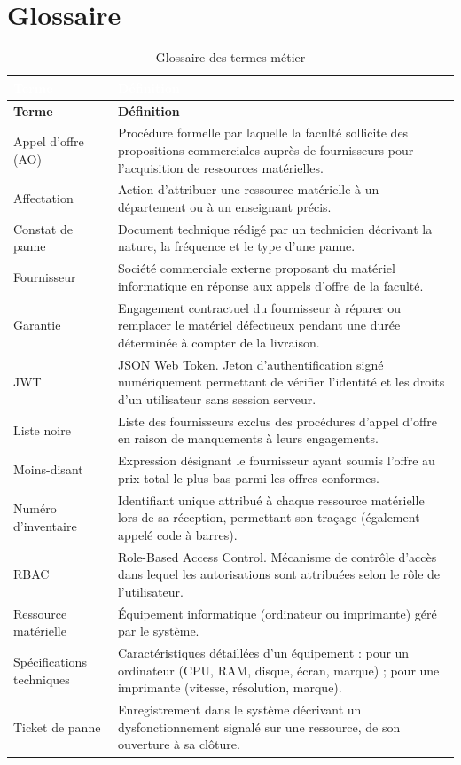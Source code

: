 \documentclass[12pt,a4paper]{report}
\begin{document}
\chapter{Glossaire}

\begin{longtable}{|L{3.5cm}|L{10cm}|}
\caption{Glossaire des termes métier} \\
\hline
{}\textcolor{white}{\textbf{Terme}} & \textcolor{white}{\textbf{Définition}} \\
\hline
\endfirsthead
\hline
\textbf{Terme} & \textbf{Définition} \\
\hline
\endhead
Appel d'offre (AO) & Procédure formelle par laquelle la faculté sollicite des propositions commerciales auprès de fournisseurs pour l'acquisition de ressources matérielles. \\
\hline
Affectation & Action d'attribuer une ressource matérielle à un département ou à un enseignant précis. \\
\hline
Constat de panne & Document technique rédigé par un technicien décrivant la nature, la fréquence et le type d'une panne. \\
\hline
Fournisseur & Société commerciale externe proposant du matériel informatique en réponse aux appels d'offre de la faculté. \\
\hline
Garantie & Engagement contractuel du fournisseur à réparer ou remplacer le matériel défectueux pendant une durée déterminée à compter de la livraison. \\
\hline
JWT & JSON Web Token. Jeton d'authentification signé numériquement permettant de vérifier l'identité et les droits d'un utilisateur sans session serveur. \\
\hline
Liste noire & Liste des fournisseurs exclus des procédures d'appel d'offre en raison de manquements à leurs engagements. \\
\hline
Moins-disant & Expression désignant le fournisseur ayant soumis l'offre au prix total le plus bas parmi les offres conformes. \\
\hline
Numéro d'inventaire & Identifiant unique attribué à chaque ressource matérielle lors de sa réception, permettant son traçage (également appelé code à barres). \\
\hline
RBAC & Role-Based Access Control. Mécanisme de contrôle d'accès dans lequel les autorisations sont attribuées selon le rôle de l'utilisateur. \\
\hline
Ressource matérielle & Équipement informatique (ordinateur ou imprimante) géré par le système. \\
\hline
Spécifications techniques & Caractéristiques détaillées d'un équipement : pour un ordinateur (CPU, RAM, disque, écran, marque) ; pour une imprimante (vitesse, résolution, marque). \\
\hline
Ticket de panne & Enregistrement dans le système décrivant un dysfonctionnement signalé sur une ressource, de son ouverture à sa clôture. \\
\hline
\end{longtable}
\end{document}
